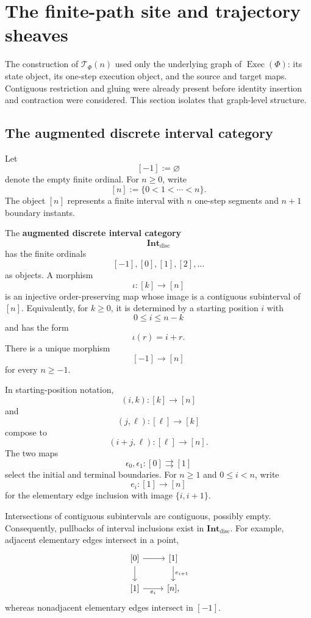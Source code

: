 \section{The finite-path site and trajectory sheaves}
\label{sec:internal-graphs-trajectory-sheaves}

The construction of \(\mathscr T_\Phi(n)\) used only the underlying graph of
\(\operatorname{Exec}(\Phi)\): its state object, its one-step execution
object, and the source and target maps. Contiguous restriction and gluing were
already present before identity insertion and contraction were considered.
This section isolates that graph-level structure.

\subsection{The augmented discrete interval category}
\label{subsec:augmented-discrete-interval-category}

Let
\[
    [-1]:=\varnothing
\]
denote the empty finite ordinal. For \(n\geq0\), write
\[
    [n]:=\{0<1<\cdots<n\}.
\]
The object \([n]\) represents a finite interval with \(n\) one-step segments
and \(n+1\) boundary instants.

\begin{definition}
\label{def:discrete-interval-category}
The \textbf{augmented discrete interval category}
\[
    \mathbf{Int}_{\mathrm{disc}}
\]
has the finite ordinals
\[
    [-1],[0],[1],[2],\ldots
\]
as objects. A morphism
\[
    \iota:[k]\longrightarrow[n]
\]
is an injective order-preserving map whose image is a contiguous subinterval
of \([n]\). Equivalently, for \(k\geq0\), it is determined by a starting
position \(i\) with
\[
    0\leq i\leq n-k
\]
and has the form
\[
    \iota(r)=i+r.
\]
There is a unique morphism
\[
    [-1]\to[n]
\]
for every \(n\geq-1\).
\end{definition}

In starting-position notation,
\[
    (i,k):[k]\to[n]
\]
and
\[
    (j,\ell):[\ell]\to[k]
\]
compose to
\[
    (i+j,\ell):[\ell]\to[n].
\]
The two maps
\[
    \epsilon_0,\epsilon_1:[0]\rightrightarrows[1]
\]
select the initial and terminal boundaries. For \(n\geq1\) and
\(0\leq i<n\), write
\[
    e_i:[1]\to[n]
\]
for the elementary edge inclusion with image \(\{i,i+1\}\).

Intersections of contiguous subintervals are contiguous, possibly empty.
Consequently, pullbacks of interval inclusions exist in
\(\mathbf{Int}_{\mathrm{disc}}\). For example, adjacent elementary edges
intersect in a point,
\[
\begin{tikzcd}
    {[0]}
        \arrow[r]
        \arrow[d]
    &
    {[1]}
        \arrow[d, "e_{i+1}"]
    \\
    {[1]}
        \arrow[r, "e_i"']
    &
    {[n]},
\end{tikzcd}
\]
whereas nonadjacent elementary edges intersect in \([-1]\).

